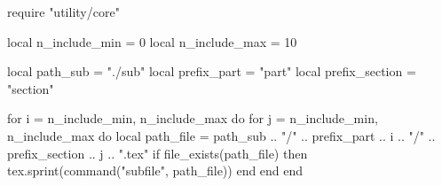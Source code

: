 \documentclass[11pt, a4paper]{ltjsarticle}
\date{\today}
\title{}
\author{}
\begin{document}
\maketitle
\tableofcontents

\begin{luacode*}
    require "utility/core"

    local n_include_min = 0
    local n_include_max = 10

    local path_sub = "./sub"
    local prefix_part = "part"
    local prefix_section = "section"

    for i = n_include_min, n_include_max do
        for j = n_include_min, n_include_max do
            local path_file = path_sub .. "/" .. prefix_part .. i .. "/" .. prefix_section .. j .. ".tex"
            if file_exists(path_file) then
                tex.sprint(command("subfile", path_file))
            end
        end
    end
\end{luacode*}



\end{document}
